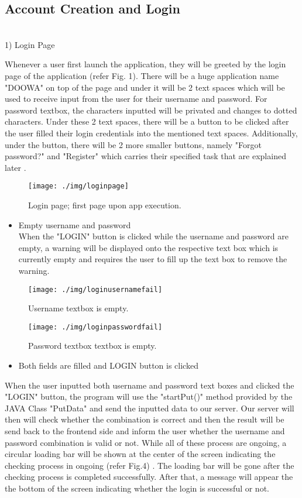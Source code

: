 \documentclass[conference]{IEEEtran}
\begin{document}
\subsection{Account Creation and Login}

\\1) Login Page

Whenever a user first launch the application, they will be greeted by the login page of the application (refer Fig. 1). There will be a huge application name "DOOWA" on top of the page and under it will be 2 text spaces which will be used to receive input from the user for their username and password. For password textbox, the characters inputted will be privated and changes to dotted characters. Under these 2 text spaces, there will be a button to be clicked after the user filled their login credentials into the mentioned text spaces. Additionally, under the button, there will be 2 more smaller buttons, namely "Forgot password?" and "Register" which carries their specified task that are explained later .
\begin{figure}[h!]
\texttt{[image: ./img/loginpage]}
\centering
\caption{Login page; first page upon app execution.}
\end{figure}

\begin{itemize}
\item Empty username and password\\
When the "LOGIN" button is clicked while the username and password are empty, a warning will be displayed onto the respective text box which is currently empty and requires the user to fill up the text box to remove the warning.
\end{itemize}

\begin{figure}[h!]
\texttt{[image: ./img/loginusernamefail]}
\centering
\caption{Username textbox is empty.}
\end{figure}
\begin{figure}[h!]
\texttt{[image: ./img/loginpasswordfail]}
\centering
\caption{Password textbox textbox is empty.}
\end{figure}

\begin{itemize}
\item Both fields are filled and LOGIN button is clicked
\end{itemize}
When the user inputted both username and password text boxes and clicked the "LOGIN" button, the program will use the "startPut()" method provided by the JAVA Class "PutData" and send the inputted data to our server. Our server will then will check whether the combination is correct and then the result will be send back to the frontend side and inform the user whether the username and password combination is valid or not. While all of these process are ongoing, a circular loading bar will be shown at the center of the screen indicating the checking process in ongoing (refer Fig.4) . The loading bar will be gone after the checking process is completed successfully. After that, a message will appear the the bottom of the screen indicating whether the login is successful or not.\\
\end{document}
